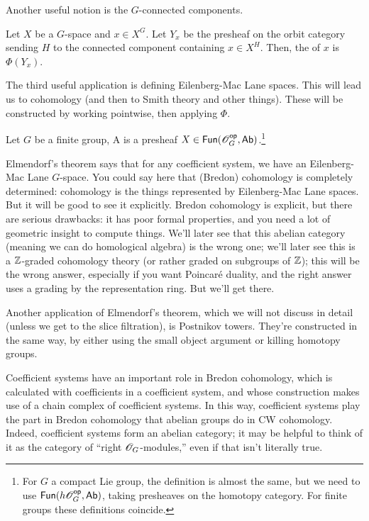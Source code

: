Another useful notion is the $G$-connected components.
\begin{defn}
Let $X$ be a $G$-space and $x\in X^G$. Let $Y_x$ be the presheaf on the orbit category sending $H$ to the connected
component containing $x\in X^H$. Then, the  of $x$ is $\Phi(Y_x)$.
\end{defn}
The third useful application is defining Eilenberg-Mac Lane spaces. This will lead us to cohomology (and then to
Smith theory and other things). These will be constructed by working pointwise, then applying $\Phi$.
\begin{defn}
Let $G$ be a finite group, A  is a presheaf $X\in\mathsf{Fun}(\mathscr O_G^{\mathsf{op}}, \mathsf{Ab})$.\footnote{For $G$ a
compact Lie group, the definition is almost the same, but we need to use $\mathsf{Fun}(h\mathscr O_G^{\mathsf{op}}, \mathsf{Ab})$, taking presheaves
on the homotopy category. For finite groups these definitions coincide.}
\end{defn}
Elmendorf's theorem says that for any coefficient system, we have an Eilenberg-Mac Lane $G$-space. You could say
here that (Bredon) cohomology is completely determined: cohomology is the things represented by Eilenberg-Mac Lane
spaces. But it will be good to see it explicitly. Bredon cohomology is explicit, but there are serious drawbacks:
it has poor formal properties, and you need a lot of geometric insight to compute things. We'll later see that this
abelian category (meaning we can do homological algebra) is the wrong one; we'll later see this is a $\mathbb Z$-graded
cohomology theory (or rather graded on subgroups of $\mathbb Z$); this will be the wrong answer, especially if you want
Poincaré duality, and the right answer uses a grading by the representation ring. But we'll get there.
\begin{rem}
Another application of Elmendorf's theorem, which we will not discuss in detail (unless we get to the slice
filtration), is Postnikov towers. They're constructed in the same way, by either using the small object argument or
killing homotopy groups.
\end{rem}
Coefficient systems have an important role in Bredon cohomology, which is calculated with coefficients in a
coefficient system, and whose construction makes use of a chain complex of coefficient systems. In this way,
coefficient systems play the part in Bredon cohomology that abelian groups do in CW cohomology. Indeed, coefficient
systems form an abelian category; it may be helpful to think of it as the category of ``right $\mathscr O_G$-modules,''
even if that isn't literally true.

